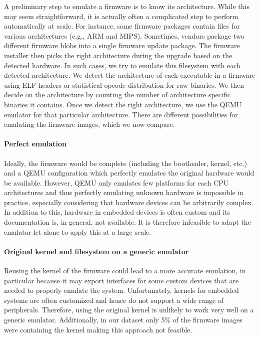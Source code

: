 \documentclass[conference]{./templates/ndss/IEEEtran}
\newcounter{t0d0_counter}
\newcounter{pr00f_counter}
\begin{document}
A preliminary step to emulate a firmware is to know its
architecture. While this may seem straightforward, it is actually
often a complicated step to perform automatically at scale.
For instance, some firmware packages contain files for various
architectures (e.g., ARM and MIPS). Sometimes, vendors package two
different firmware blobs into a single firmware update package. The
firmware installer then picks the right architecture during the
upgrade based on the detected hardware. In such cases, we try to
emulate this filesystem with each detected architecture.  We
detect the architecture of each executable in a firmware using ELF
headers or statistical opcode distribution for raw binaries.  We then
decide on the architecture by counting the number of
architecture specific binaries it contains. Once we detect the right architecture, 
we use the QEMU emulator for that particular architecture. There are
different possibilities for emulating the firmware images, which we now 
compare.


\paragraph{Perfect emulation}

Ideally, the firmware would be complete (including the bootloader,
kernel, etc.)  and a QEMU configuration which perfectly emulates the
original hardware would be available.
However, QEMU only emulates few platforms for each CPU architectures and thus
perfectly emulating unknown hardware is impossible in practice, especially considering that
hardware devices can be arbitrarily complex.
In addition to this, hardware in embedded devices is often custom and
its documentation is, in general, not available. It is therefore infeasible to adapt the
emulator let alone to apply this at a large scale.


\paragraph{Original kernel and filesystem on a generic emulator}

Reusing the kernel of the firmware could lead to a more accurate
emulation, in particular because it may export interfaces for some
custom devices that are needed to properly emulate the system.
Unfortunately, kernels for embedded systems are often customized and
hence do not support a wide range of peripherals. Therefore, using
the original kernel is unlikely to work very well on a generic
emulator.  Additionally, in our dataset only 5\% of the
firmware images were containing the kernel making this approach not
feasible.
\end{document}
